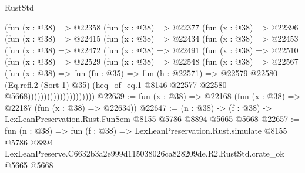 \begin{lexlean}{RustStd}
\begin{coremodule}
                  (fun (x : @38) =>
                  @22358
                    (fun (x : @38) =>
                    @22377
                      (fun (x : @38) =>
                      @22396
                        (fun (x : @38) =>
                        @22415
                          (fun (x : @38) =>
                          @22434
                            (fun (x : @38) =>
                            @22453
                              (fun (x : @38) =>
                              @22472
                                (fun (x : @38) =>
                                @22491
                                  (fun (x : @38) =>
                                  @22510
                                    (fun (x : @38) =>
                                    @22529
                                      (fun (x : @38) =>
                                      @22548
                                        (fun (x : @38) =>
                                        @22567
                                          (fun (x : @38) =>
                                          fun (fn : @35) =>
                                          fun (h : @22571) =>
                                          @22579
                                            @22580
                                            (Eq.refl.{2} (Sort 1) @35)
                                            (heq_of_eq.{1}
                                              @8146
                                              @22577
                                              @22580
                                              @5668)))))))))))))))))))))
@22639 := fun (x : @38) => @22168 (fun (x : @38) => @22187 (fun (x : @38) => @22634))
@22647 := (n : @38) -> (f : @38) -> LexLeanPreservation.Rust.FunSem @8155 @5786 @8894 @5665 @5668
@22657 := fun (n : @38) =>
  fun (f : @38) =>
  LexLeanPreservation.Rust.simulate
    @8155
    @5786
    @8894
    LexLeanPreserve.C6632b3a2e999d115038026ca828209de.R2.RustStd.crate_ok
    @5665
    @5668
\end{coremodule}
\end{lexlean}
